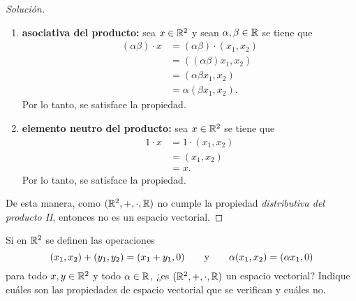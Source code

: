 \documentclass[a4,11pt]{aleph-notas}
\begin{document}
\begin{proof}[Solución]
\begin{enumerate}
    \item \textbf{asociativa del producto:}
        sea $x\in \mathbb{R}^2$ y sean $\alpha,\beta\in \mathbb{R}$ se tiene que
        \begin{align*}
            (\alpha\beta)\cdot x & = (\alpha\beta)\cdot (x_1,x_2) \\
                & = ((\alpha\beta) x_1,x_2)\\
                & = (\alpha \beta x_1, x_2) \\
                & = \alpha ( \beta x_1,x_2 ).
        \end{align*}
        Por lo tanto, se satisface la propiedad.
    \item \textbf{elemento neutro del producto:}
        sea $x\in \mathbb{R}^2$ se tiene que
        \begin{align*}
            1\cdot x & =1 \cdot (x_1,x_2) \\
                & = (x_1,x_2) \\
                & = x.
        \end{align*}
        Por lo tanto, se satisface la propiedad.
    \end{enumerate}
    De esta manera, como $(\mathbb{R}^2,+,\cdot,\mathbb{R})$ no cumple la propiedad \emph{distributiva del producto II}, entonces no es un espacio vectorial.
\end{proof}

\begin{ejer}
    Si en $\mathbb{R}^2$ se definen las operaciones
\[
(x_1,x_2) + (y_1,y_2) = (x_1+y_1,0) \qquad\text{y}\qquad \alpha(x_1,x_2) = (\alpha x_1,0)
\]
para todo $x,y\in\mathbb{R}^2$ y todo $\alpha\in\mathbb{R}$, ¿es $(\mathbb{R}^2,+,\cdot,\mathbb{R})$ un espacio vectorial? Indique cuáles son las propiedades de espacio vectorial que se verifican y cuáles no.
\end{ejer}
\end{document}

